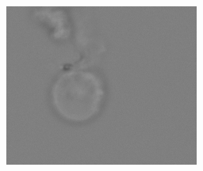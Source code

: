 \begin{figure}[ht]
	\begin{center}
		\begin{subfigure}[b]{0.25\textwidth}
			\includegraphics[width=\textwidth]{thesis-template-master/images/noisefortest (106).png}
			\label{fig:Debris}
		\end{subfigure}
		\begin{subfigure}[b]{0.25\textwidth}

\end{subfigure}
\end{center}
\end{figure}
